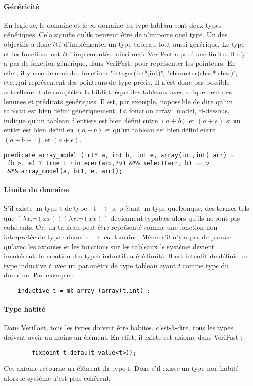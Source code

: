 \documentclass[11pt,openany]{article}
\newcommand{\verifast}{VeriFast}
\begin{document}
			\paragraph{G\'en\'ericit\'e}
			En logique, le domaine et le co-domaine du type tableau sont deux types g\'en\'eriques. Cela signifie qu'ils peuvent \^etre de n'importe quel type. Un des objectifs a donc \'et\'e d'impl\'ementer un type tableau tout aussi g\'en\'erique. Le type et les fonctions ont \'et\'e implement\'ees ainsi mais \verifast{} a pos\'e une limite. Il n'y a pas de fonction g\'en\'erique, dans \verifast, pour repr\'esenter les pointeurs. En effet, il y a seulement des fonctions "integer(int*,int)", "character(char*,char)", etc\ldots qui repr\'esentent des pointeurs de type pr\'ecis. Il n'est donc pas possible actuellement de compl\'eter la biblioth\`eque des tableaux avec uniquement des lemmes et pr\'edicats g\'en\'eriques. Il est, par exemple, impossible de dire qu'un tableau est bien d\'efini g\'en\'eriquement. La fonction array\_model, ci-dessous, indique qu'un tableau d'entiers est bien d\'efini entre $(a+b)$ et $(a+e)$ si un entier est bien d\'efini en $(a+b)$ et qu'un tableau est bien d\'efini entre $(a+b+1)$ et $(a+e)$.
\begin{lstlisting}
predicate array_model (int* a, int b, int e, array(int,int) arr) =
 (b >= e) ? true : (integer(a+b,?v) &*& select(arr, b) == v
 &*& array_model(a, b+1, e, arr));
\end{lstlisting}
			\paragraph{Limite du domaine}
			S'il existe un type t de type : t $\rightarrow$ p, p \'etant un type quelconque, des termes tels que $(\lambda x. \neg(xx))(\lambda x.\neg(xx))$ 	deviennent typables alors qu'ils ne sont pas coh\'erents. Or, un tableau peut \^etre repr\'esent\'e comme une fonction non-interpr\'et\'ee de type : domain $\rightarrow$ co-domaine. M\^eme s'il n'y a pas de preuve qu'avec les axiomes et les fonctions sur les tableaux le syst\`eme devient incoh\'erent, la cr\'eation des types inductifs a \'et\'e limit\'e. Il est interdit de d\'efinir un type inductive $t$ avec un param\`etre de type tableau ayant $t$ comme type du domaine. Par exemple :
			\begin{lstlisting}			
    inductive t = mk_array (array(t,int));
			\end{lstlisting}
			\paragraph{Type habit\'e}
				Dans \verifast{}, tous les types doivent \^etre habit\'es, c'est-\`a-dire, tous les types doivent avoir au moins un \'el\'ement. En effet, il existe cet axiome dans \verifast{} :
		\begin{lstlisting}
		fixpoint t default_value<t>();
		\end{lstlisting}
		Cet axiome retourne un \'el\'ement du type t. Donc s'il existe un type non-habit\'e alors le syst\`eme n'est plus coh\'erent.
		
\end{document}
